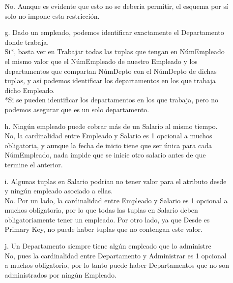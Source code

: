 \documentclass[12pt,a4paper]{article}
\begin{document}
\begin{enumerate}
\begin{enumerate}
            No. Aunque es evidente que esto no se debería permitir, el esquema por sí solo no impone esta restricción.\\
            
			\pagebreak
            \item[g.] Dado un empleado, podemos identificar exactamente el Departamento donde trabaja.\\
            
            Si*, basta ver en Trabajar todas las tuplas que tengan en NúmEmpleado el mismo valor que el NúmEmpleado de nuestro Empleado y los departamentos que compartan NúmDepto con el NúmDepto de dichas tuplas, y así podemos identificar los departamentos en los que trabaja dicho Empleado. \\
            *Si se pueden identificar los departamentos en los que trabaja, pero no podemos asegurar que es un solo departamento.\\
            
            \item[h.] Ningún empleado puede cobrar más de un Salario al mismo tiempo.\\
        
            No, la cardinalidad entre Empleado y Salario es 1 opcional a muchos obligatoria, y aunque la fecha de inicio tiene que ser única para cada NúmEmpleado, nada impide que se inicie otro salario antes de que termine el anterior. \\
            
            \item[i.] Algunas tuplas en Salario podrían no tener valor para el atributo desde
                y ningún empleado asociado a ellas.\\
            
            No. Por un lado, la cardinalidad entre Empleado y Salario es 1 opcional a muchos obligatoria, por lo que todas las tuplas en Salario deben obligatoriamente tener un empleado. Por otro lado, ya que Desde es Primary Key, no puede haber tuplas que no contengan este valor.\\
                
            \item[j.] Un Departamento siempre tiene algún empleado que lo administre\\
            
            No, pues la cardinalidad entre Departamento y Administrar es 1 opcional a muchos obligatorio, por lo tanto puede haber Departamentos que no son administrados por ningún Empleado.\\
        
        \end{enumerate}

\end{enumerate}
\end{document}
